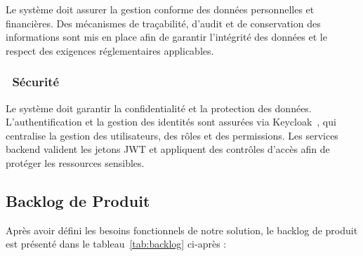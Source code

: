 Le système doit assurer la gestion conforme des données personnelles et financières. Des
mécanismes de traçabilité, d'audit et de conservation des informations sont mis en place afin
de garantir l'intégrité des données et le respect des exigences réglementaires applicables.

\subsubsection*{~Sécurité}

Le système doit garantir la confidentialité et la protection des données. L'authentification
et la gestion des identités sont assurées via Keycloak~\cite{KeycloakOrg}, qui centralise la
gestion des utilisateurs, des rôles et des permissions. Les services backend valident les
jetons JWT et appliquent des contrôles d'accès afin de protéger les ressources sensibles.

\subsection{Backlog de Produit}

\setcounter{table}{0}
\renewcommand{\thetable}{1.\arabic{table}}

Après avoir défini les besoins fonctionnels de notre solution, le backlog de produit est présenté
dans le tableau~\ref{tab:backlog} ci-après :

